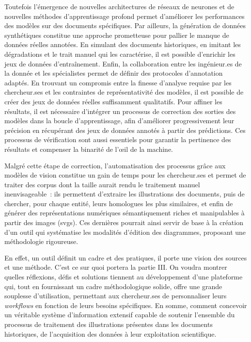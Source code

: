 \documentclass[a4paper,12pt,twoside]{book}
\newcommand{\svgs}{\gls{svg}s\xspace}
\begin{document}
Toutefois l'émergence de nouvelles architectures de réseaux de neurones
et de nouvelles méthodes d'apprentissage profond permet d'améliorer les
performances des modèles sur des documents spécifiques. Par ailleurs, la
génération de données synthétiques constitue une approche prometteuse
pour pallier le manque de données réelles annotées. En simulant des
documents historiques, en imitant les dégradations et le trait manuel qui
les caractérise, il est possible d'enrichir les jeux de données
d'entraînement. Enfin, la collaboration entre les ingénieur.es de la
donnée et les spécialistes permet de définir des protocoles d'annotation
adaptés. En trouvant un compromis entre la finesse d'analyse requise par
les chercheur.ses et les contraintes de représentativité des modèles, il
est possible de créer des jeux de données réelles suffisamment
qualitatifs. Pour affiner les résultats, il est nécessaire d'intégrer un
processus de correction des sorties des modèles dans la boucle
d'apprentissage, afin d'améliorer progressivement leur précision en
récupérant des jeux de données annotés à partir des prédictions. Ces
processus de vérification sont aussi essentiels pour garantir la
pertinence des résultats et compenser la binarité de l'œil de la
machine.

Malgré cette étape de correction, l'automatisation des processus grâce
aux modèles de vision constitue un gain de temps pour les chercheur.ses et
permet de traiter des corpus dont la taille aurait rendu le traitement
manuel inenvisageable~: ils permettent d'extraire les illustrations des
documents, puis de chercher, pour chaque entité, leurs homologues les
plus similaires, et enfin de générer des représentations numériques
sémantiquement riches et manipulables à partir des images (\svgs). Ces
dernières pourrait ainsi servir de base à la création d'un outil qui
systématise les modalités d'édition des diagrammes, proposant une
méthodologie rigoureuse.

En effet, un outil définit un cadre et des pratiques, il porte une
vision des sources et une méthode. C'est ce sur quoi portera la partie
III. On voudra montrer quelles réflexions, défis et solutions tiennent
au développement d'une plateforme qui, tout en fournissant un cadre
méthodologique solide, offre une grande souplesse d'utilisation,
permettant aux chercheur.ses de personnaliser leurs \textit{workflows} en fonction de
leurs besoins spécifiques. En somme, comment concevoir un véritable
système d'information extensif capable de soutenir l'ensemble du
processus de traitement des illustrations présentes dans les documents
historiques, de l'acquisition des données à leur exploitation
scientifique.
\end{document}
